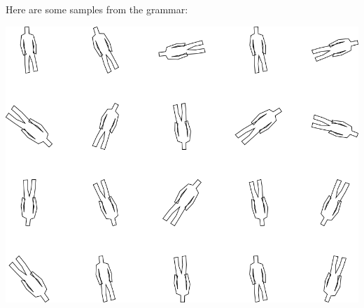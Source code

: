 Here are some samples from the grammar:

\includegraphics[width=6in]{output/3.learning/full_tuning/sdf0_iter0/samples.png}

